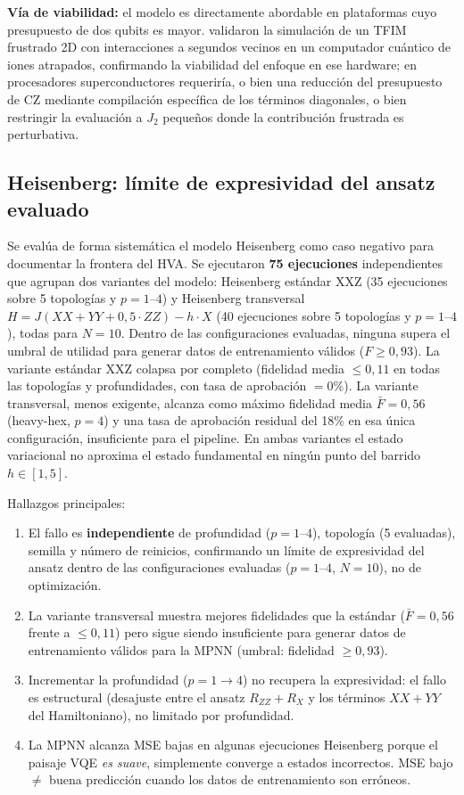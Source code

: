 \documentclass[11pt,a4paper,spanish]{book}
\begin{document}
\textbf{Vía de viabilidad:} el modelo es directamente abordable en plataformas cuyo presupuesto de dos qubits es mayor. \citet{teoh2025} validaron la simulación de un TFIM frustrado 2D con interacciones a segundos vecinos en un computador cuántico de iones atrapados, confirmando la viabilidad del enfoque en ese hardware; en procesadores superconductores requeriría, o bien una reducción del presupuesto de CZ mediante compilación específica de los términos diagonales, o bien restringir la evaluación a $J_2$ pequeños donde la contribución frustrada es perturbativa.

\subsection{Heisenberg: límite de expresividad del ansatz evaluado}

Se evalúa de forma sistemática el modelo Heisenberg como caso negativo para documentar la frontera del HVA. Se ejecutaron \textbf{75 ejecuciones} independientes que agrupan dos variantes del modelo: Heisenberg estándar XXZ (35 ejecuciones sobre 5 topologías y $p = 1$--$4$) y Heisenberg transversal $H = J(XX + YY + 0,5 \cdot ZZ) - h \cdot X$ (40 ejecuciones sobre 5 topologías y $p = 1$--$4$), todas para $N = 10$. Dentro de las configuraciones evaluadas, ninguna supera el umbral de utilidad para generar datos de entrenamiento válidos ($F \geq 0,93$). La variante estándar XXZ colapsa por completo (fidelidad media $\leq 0,11$ en todas las topologías y profundidades, con tasa de aprobación $= 0\%$). La variante transversal, menos exigente, alcanza como máximo fidelidad media $\bar{F} = 0,56$ (heavy-hex, $p = 4$) y una tasa de aprobación residual del 18\% en esa única configuración, insuficiente para el pipeline. En ambas variantes el estado variacional no aproxima el estado fundamental en ningún punto del barrido $h \in [1, 5]$.

Hallazgos principales:
\begin{enumerate}
    \item El fallo es \textbf{independiente} de profundidad ($p = 1$--$4$), topología (5 evaluadas), semilla y número de reinicios, confirmando un límite de expresividad del ansatz dentro de las configuraciones evaluadas ($p = 1$--$4$, $N = 10$), no de optimización.
    \item La variante transversal muestra mejores fidelidades que la estándar ($\bar{F} = 0,56$ frente a $\leq 0,11$) pero sigue siendo insuficiente para generar datos de entrenamiento válidos para la MPNN (umbral: fidelidad $\geq 0,93$).
    \item Incrementar la profundidad ($p = 1 \to 4$) no recupera la expresividad: el fallo es estructural (desajuste entre el ansatz $R_{ZZ} + R_X$ y los términos $XX + YY$ del Hamiltoniano), no limitado por profundidad.
    \item La MPNN alcanza MSE bajas en algunas ejecuciones Heisenberg porque el paisaje VQE \emph{es suave}, simplemente converge a estados incorrectos. MSE bajo $\neq$ buena predicción cuando los datos de entrenamiento son erróneos.
\end{enumerate}
\end{document}
